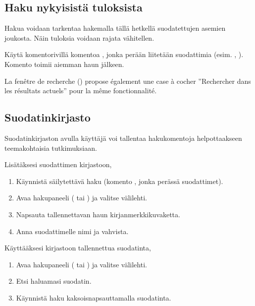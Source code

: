 \documentclass[letterpaper,10pt,finnish]{sphinxmanual}
\begin{document}
\subsection{Haku nykyisistä tuloksista}
\label{\detokenize{annexe_filtres:recherche-dans-les-resultats-courants}}
\sphinxAtStartPar
Hakua voidaan tarkentaa hakemalla tällä hetkellä suodatettujen asemien joukosta. Näin tuloksia voidaan rajata vähitellen.

\sphinxAtStartPar
Käytä komentorivillä komentoa , jonka perään liitetään suodattimia (esim. , ). Komento  toimii aiemman haun jälkeen.

\sphinxAtStartPar
La fenêtre de recherche () propose également une case à cocher
”Rechercher dans les résultats actuels” pour la même fonctionnalité.


\subsection{Suodatinkirjasto}
\label{\detokenize{annexe_filtres:bibliotheque-de-filtres}}
\sphinxAtStartPar
Suodatinkirjaston avulla käyttäjä voi tallentaa hakukomentoja helpottaakseen teemakohtaisia tutkimuksiaan.

\sphinxAtStartPar
Lisätäksesi suodattimen kirjastoon,
\begin{enumerate}
%
\item {} 
\sphinxAtStartPar
Käynnistä säilytettävä haku (komento , jonka perässä suodattimet).

\item {} 
\sphinxAtStartPar
Avaa hakupaneeli ( tai ) ja valitse \sphinxhyphen{}välilehti.

\item {} 
\sphinxAtStartPar
Napsauta tallennettavan haun kirjanmerkkikuvaketta.

\item {} 
\sphinxAtStartPar
Anna suodattimelle nimi ja vahvista.

\end{enumerate}

\sphinxAtStartPar
Käyttääksesi kirjastoon tallennettua suodatinta,
\begin{enumerate}
%
\item {} 
\sphinxAtStartPar
Avaa hakupaneeli ( tai ) ja valitse \sphinxhyphen{}välilehti.

\item {} 
\sphinxAtStartPar
Etsi haluamasi suodatin.

\item {} 
\sphinxAtStartPar
Käynnistä haku kaksoisnapsauttamalla suodatinta.

\end{enumerate}
\end{document}
